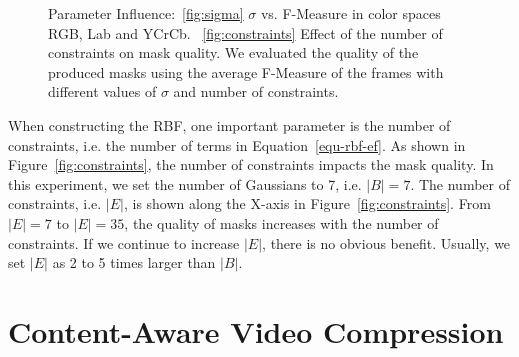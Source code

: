 \begin{figure}
	\centering
	\caption{Parameter Influence:~\ref{fig:sigma} $\sigma$ vs. F-Measure in color spaces RGB, Lab and YCrCb. ~\ref{fig:constraints} Effect of the number of constraints on mask quality. We evaluated the quality of the produced masks using the average F-Measure of the frames with different values of $\sigma$ and number of constraints.} 
	\label{fig-params}
\end{figure}

When constructing the RBF, one important parameter is the number of constraints, i.e. the number of terms in Equation~\ref{equ-rbf-ef}.
As shown in Figure~\ref{fig:constraints}, the number of constraints impacts the mask quality. In this experiment, we set the number of Gaussians to 7, i.e. $|B|=7$. The number of constraints, i.e. $|E|$, is shown along the X-axis in
Figure~\ref{fig:constraints}.
From $|E|=7$ to $|E|=35$, the quality of masks increases with the number of constraints. If we continue to increase $|E|$, there is no obvious benefit. Usually, we set $|E|$ as 2 to 5 times larger than $|B|$.

\section{Content-Aware Video Compression}
\label{os-compression}

